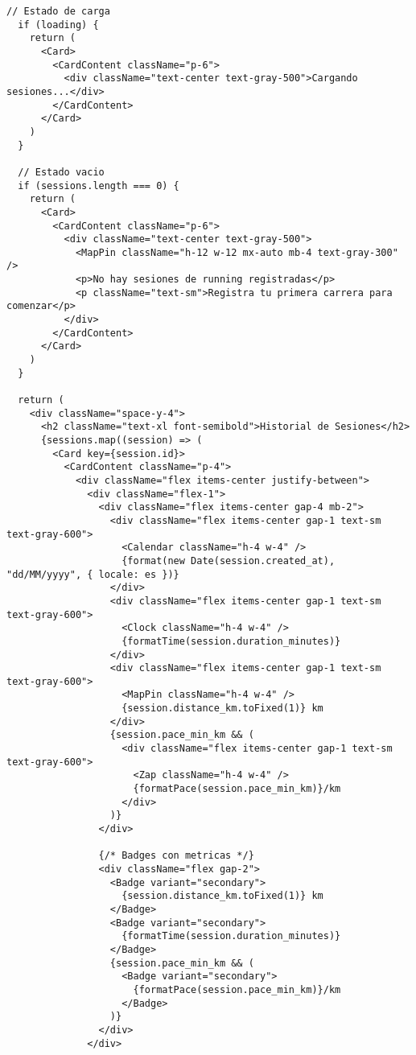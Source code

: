 \documentclass[12pt,a4paper]{article}
\begin{document}
\begin{lstlisting}[caption=components/running/running-list.tsx - Estructura principal]
  // Estado de carga
  if (loading) {
    return (
      <Card>
        <CardContent className="p-6">
          <div className="text-center text-gray-500">Cargando sesiones...</div>
        </CardContent>
      </Card>
    )
  }

  // Estado vacio
  if (sessions.length === 0) {
    return (
      <Card>
        <CardContent className="p-6">
          <div className="text-center text-gray-500">
            <MapPin className="h-12 w-12 mx-auto mb-4 text-gray-300" />
            <p>No hay sesiones de running registradas</p>
            <p className="text-sm">Registra tu primera carrera para comenzar</p>
          </div>
        </CardContent>
      </Card>
    )
  }

  return (
    <div className="space-y-4">
      <h2 className="text-xl font-semibold">Historial de Sesiones</h2>
      {sessions.map((session) => (
        <Card key={session.id}>
          <CardContent className="p-4">
            <div className="flex items-center justify-between">
              <div className="flex-1">
                <div className="flex items-center gap-4 mb-2">
                  <div className="flex items-center gap-1 text-sm text-gray-600">
                    <Calendar className="h-4 w-4" />
                    {format(new Date(session.created_at), "dd/MM/yyyy", { locale: es })}
                  </div>
                  <div className="flex items-center gap-1 text-sm text-gray-600">
                    <Clock className="h-4 w-4" />
                    {formatTime(session.duration_minutes)}
                  </div>
                  <div className="flex items-center gap-1 text-sm text-gray-600">
                    <MapPin className="h-4 w-4" />
                    {session.distance_km.toFixed(1)} km
                  </div>
                  {session.pace_min_km && (
                    <div className="flex items-center gap-1 text-sm text-gray-600">
                      <Zap className="h-4 w-4" />
                      {formatPace(session.pace_min_km)}/km
                    </div>
                  )}
                </div>
                
                {/* Badges con metricas */}
                <div className="flex gap-2">
                  <Badge variant="secondary">
                    {session.distance_km.toFixed(1)} km
                  </Badge>
                  <Badge variant="secondary">
                    {formatTime(session.duration_minutes)}
                  </Badge>
                  {session.pace_min_km && (
                    <Badge variant="secondary">
                      {formatPace(session.pace_min_km)}/km
                    </Badge>
                  )}
                </div>
              </div>


\end{lstlisting}
\end{document}
